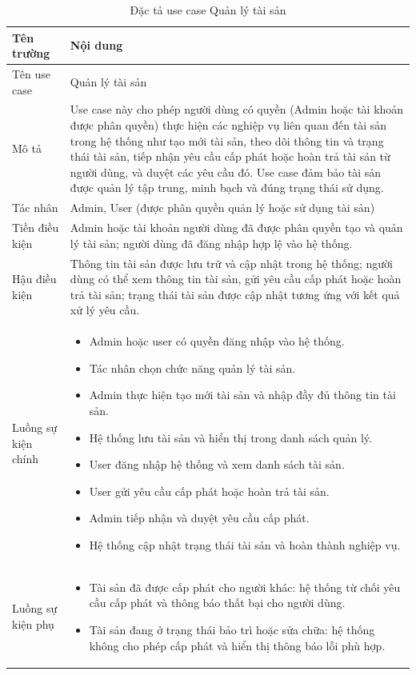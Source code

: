 \documentclass[../DoAn.tex]{subfiles}
\begin{document}
\begin{table}[H]
\centering
\renewcommand{\arraystretch}{1.4}
\begin{tabular}{|p{4cm}|p{11cm}|}
\hline
\textbf{Tên trường} & \textbf{Nội dung} \\
\hline

Tên use case &
Quản lý tài sản \\
\hline

Mô tả &
Use case này cho phép người dùng có quyền (Admin hoặc tài khoản được phân quyền) thực hiện các nghiệp vụ liên quan đến tài sản trong hệ thống như tạo mới tài sản, theo dõi thông tin và trạng thái tài sản, tiếp nhận yêu cầu cấp phát hoặc hoàn trả tài sản từ người dùng, và duyệt các yêu cầu đó. Use case đảm bảo tài sản được quản lý tập trung, minh bạch và đúng trạng thái sử dụng. \\
\hline

Tác nhân &
Admin, User (được phân quyền quản lý hoặc sử dụng tài sản) \\
\hline

Tiền điều kiện &
Admin hoặc tài khoản người dùng đã được phân quyền tạo và quản lý tài sản; người dùng đã đăng nhập hợp lệ vào hệ thống. \\
\hline

Hậu điều kiện &
Thông tin tài sản được lưu trữ và cập nhật trong hệ thống; người dùng có thể xem thông tin tài sản, gửi yêu cầu cấp phát hoặc hoàn trả tài sản; trạng thái tài sản được cập nhật tương ứng với kết quả xử lý yêu cầu. \\
\hline

Luồng sự kiện chính &
\begin{itemize}
    \item Admin hoặc user có quyền đăng nhập vào hệ thống.
    \item Tác nhân chọn chức năng quản lý tài sản.
    \item Admin thực hiện tạo mới tài sản và nhập đầy đủ thông tin tài sản.
    \item Hệ thống lưu tài sản và hiển thị trong danh sách quản lý.
    \item User đăng nhập hệ thống và xem danh sách tài sản.
    \item User gửi yêu cầu cấp phát hoặc hoàn trả tài sản.
    \item Admin tiếp nhận và duyệt yêu cầu cấp phát.
    \item Hệ thống cập nhật trạng thái tài sản và hoàn thành nghiệp vụ.
\end{itemize} \\
\hline

Luồng sự kiện phụ &
\begin{itemize}
    \item Tài sản đã được cấp phát cho người khác: hệ thống từ chối yêu cầu cấp phát và thông báo thất bại cho người dùng.
    \item Tài sản đang ở trạng thái bảo trì hoặc sửa chữa: hệ thống không cho phép cấp phát và hiển thị thông báo lỗi phù hợp.
\end{itemize} \\
\hline

\end{tabular}
\caption{Đặc tả use case Quản lý tài sản}
\end{table}
\hfill
\end{document}
